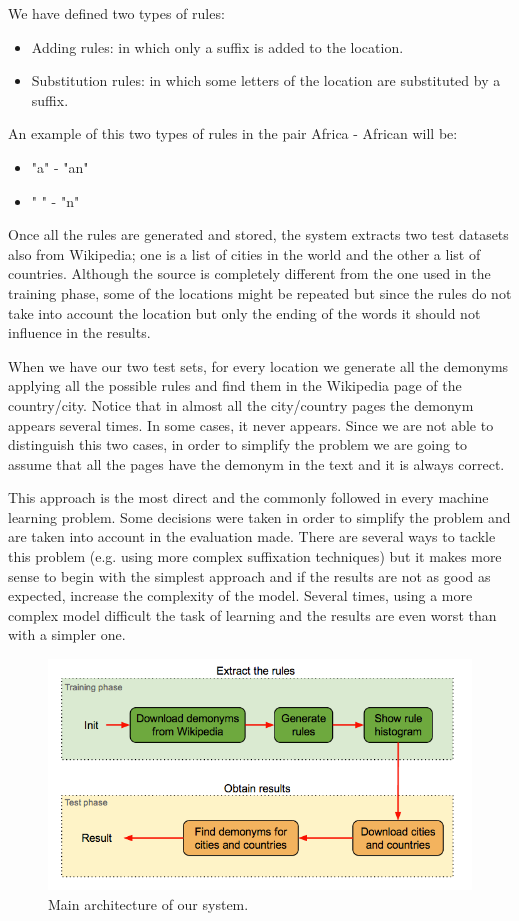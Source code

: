 \documentclass[]{report}
\begin{document}
We have defined two types of rules:
\begin{itemize}
\item Adding rules: in which only a suffix is added to the location.
\item Substitution rules: in which some letters of the location are substituted by a suffix.
\end{itemize}

An example of this two types of rules in the pair Africa - African will be:
\begin{itemize}
\item "a" - "an"
\item " " - "n"
\end{itemize}

Once all the rules are generated and stored, the system extracts two test datasets also from Wikipedia; one is a list of cities in the world and the other a list of countries. Although the source is completely different from the one used in the training phase, some of the locations might be repeated but since the rules do not take into account the location but only the ending of the words it should not influence in the results.

When we have our two test sets, for every location we generate all the demonyms applying all the possible rules and find them in the Wikipedia page of the country/city. Notice that in almost all the city/country pages the demonym appears several times. In some cases, it never appears. Since we are not able to distinguish this two cases, in order to simplify the problem we are going to assume that all the pages have the demonym in the text and it is always correct. 


This approach is the most direct and the commonly followed in every machine learning problem. Some decisions were taken in order to simplify the problem and are taken into account in the evaluation made. There are several ways to tackle this problem (e.g. using more complex suffixation techniques) but it makes more sense to begin with the simplest approach and if the results are not as good as expected, increase the complexity of the model. Several times, using a more complex model difficult the task of learning and the results are even worst than with a simpler one.

\begin{figure}[htb!]
\centering
\includegraphics[scale=0.5]{img/architecture}
\caption{Main architecture of our system.}
\label{Main architecture of our system.}
\end{figure}
\end{document}
